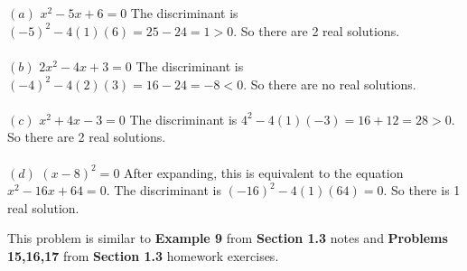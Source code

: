 \documentclass {article}
\newenvironment{prob}[2][]{\begin{trivlist}
\item[\hskip \labelsep {\bfseries #1}\hskip \labelsep {\bfseries #2.}]}{\end{trivlist}}
\begin{document}
\vspace {1cm}

\begin {prob}{5} \ \\ \\ \relax
$(a)$ $x^2 - 5x + 6 = 0$ The discriminant is $(-5)^2 - 4(1)(6) = 25 - 24 = 1 > 0$. So there are 2 real solutions.
\\ \\
$(b)$ $2x^2 - 4x + 3 = 0$ The discriminant is $(-4)^2 - 4(2)(3) = 16 - 24 = -8 < 0$. So there are no real solutions.
\\ \\
$(c)$ $x^2 + 4x - 3 = 0$ The discriminant is $4^2 - 4(1)(-3) = 16 + 12 = 28 > 0$. So there are 2 real solutions.
\\ \\
$(d)$ $(x-8)^2 = 0$ After expanding, this is equivalent to the equation
$x^2 - 16x + 64 = 0$. The discriminant is $(-16)^2 - 4(1)(64) = 0$. So there is 1 real solution.
\end {prob}
This problem is similar to \textbf{Example 9} from \textbf{Section 1.3} notes and
\textbf{Problems 15,16,17} from \textbf{Section 1.3} homework exercises.
\end{document}
